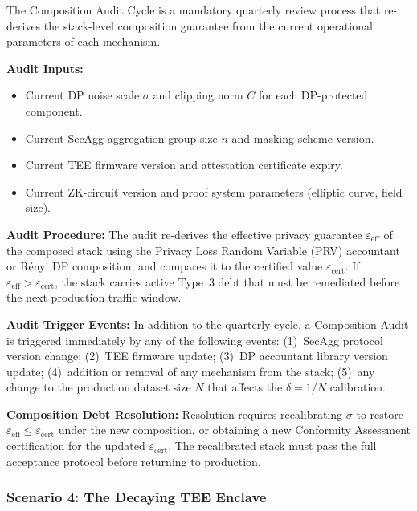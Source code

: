 \begin{tcolorbox}[debtpattern,
  title={Debt Management Pattern 3 --- Composition Audit Cycle}]

The Composition Audit Cycle is a mandatory quarterly review
process that re-derives the stack-level composition guarantee
from the current operational parameters of each mechanism.

\textbf{Audit Inputs:}
\begin{itemize}
  \item Current DP noise scale $\sigma$ and clipping norm $C$
    for each DP-protected component.
  \item Current SecAgg aggregation group size $n$ and
    masking scheme version.
  \item Current TEE firmware version and attestation
    certificate expiry.
  \item Current ZK-circuit version and proof system
    parameters (elliptic curve, field size).
\end{itemize}

\textbf{Audit Procedure:}
The audit re-derives the effective privacy guarantee
$\varepsilon_{\mathrm{eff}}$ of the composed stack using
the Privacy Loss Random Variable (PRV) accountant or
R\'{e}nyi DP composition, and
compares it to the certified value $\varepsilon_{\mathrm{cert}}$.
If $\varepsilon_{\mathrm{eff}} > \varepsilon_{\mathrm{cert}}$,
the stack carries active Type~3 debt that must be remediated
before the next production traffic window.

\textbf{Audit Trigger Events:}
In addition to the quarterly cycle, a Composition Audit is
triggered immediately by any of the following events:
(1)~SecAgg protocol version change;
(2)~TEE firmware update;
(3)~DP accountant library version update;
(4)~addition or removal of any mechanism from the stack;
(5)~any change to the production dataset size $N$ that
affects the $\delta = 1/N$ calibration.

\textbf{Composition Debt Resolution:}
Resolution requires recalibrating $\sigma$ to restore
$\varepsilon_{\mathrm{eff}} \leq \varepsilon_{\mathrm{cert}}$
under the new composition, or obtaining a new Conformity
Assessment certification for the updated $\varepsilon_{\mathrm{cert}}$.
The recalibrated stack must pass the full acceptance
protocol before returning to production.
\end{tcolorbox}

\subsubsection{Scenario 4: The Decaying TEE Enclave}
\label{subsubsec:scenario-tee-entropy}

